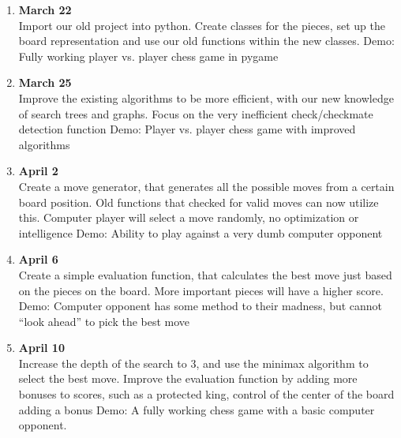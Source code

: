 \documentclass{article}
\begin{document}
  \begin{enumerate}
    \item \textbf{March 22}\\ Import our old project into python. Create classes
    for the pieces, set up the board representation and use our old functions
    within the new classes. Demo: Fully working player vs. player chess game in
    pygame

    \item \textbf{March 25}\\ Improve the existing algorithms to be more
    efficient, with our new knowledge of search trees and graphs. Focus on the
    very inefficient check/checkmate detection function Demo: Player vs. player
    chess game with improved algorithms

    \item \textbf{April 2}\\ Create a move generator, that generates all the
    possible moves from a certain board position. Old functions that checked for
    valid moves can now utilize this. Computer player will select a move
    randomly, no optimization or intelligence Demo: Ability to play against a
    very dumb computer opponent

    \item \textbf{April 6}\\ Create a simple evaluation function, that
    calculates the best move just based on the pieces on the board. More
    important pieces will have a higher score. Demo: Computer opponent has some
    method to their madness, but cannot “look ahead” to pick the best move

    \item \textbf{April 10}\\ Increase the depth of the search to 3, and use the
    minimax algorithm to select the best move. Improve the evaluation function
    by adding more bonuses to scores, such as a protected king, control of the
    center of the board adding a bonus Demo: A fully working chess game with a
    basic computer opponent.
\end{enumerate}
\end{document}
